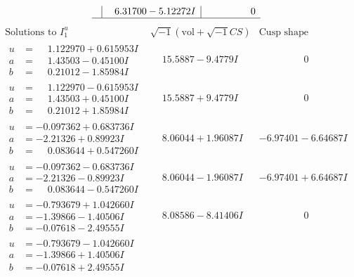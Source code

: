 \documentclass[1p]{elsarticle_modified}
\theoremstyle{definition}
\newcommand{\I}{\sqrt{-1}}
\begin{document}
$$\begin{array}{c|c|c}
 & \phantom{-}6.31700 - 5.12272 I & \phantom{-0.000000 } 0\\
 \hline 
 \end{array}$$\newpage$$\begin{array}{c|c|c}  
\text{Solutions to }I^u_{1}& \I (\text{vol} + \sqrt{-1}CS) & \text{Cusp shape}\\
 \hline 
\begin{aligned}
u &= \phantom{-}1.122970 + 0.615953 I \\
a &= \phantom{-}1.43503 - 0.45100 I \\
b &= \phantom{-}0.21012 - 1.85984 I\end{aligned}
 & \phantom{-}15.5887 - 9.4779 I & \phantom{-0.000000 } 0 \\ \hline\begin{aligned}
u &= \phantom{-}1.122970 - 0.615953 I \\
a &= \phantom{-}1.43503 + 0.45100 I \\
b &= \phantom{-}0.21012 + 1.85984 I\end{aligned}
 & \phantom{-}15.5887 + 9.4779 I & \phantom{-0.000000 } 0 \\ \hline\begin{aligned}
u &= -0.097362 + 0.683736 I \\
a &= -2.21326 + 0.89923 I \\
b &= \phantom{-}0.083644 + 0.547260 I\end{aligned}
 & \phantom{-}8.06044 + 1.96087 I & -6.97401 - 6.64687 I \\ \hline\begin{aligned}
u &= -0.097362 - 0.683736 I \\
a &= -2.21326 - 0.89923 I \\
b &= \phantom{-}0.083644 - 0.547260 I\end{aligned}
 & \phantom{-}8.06044 - 1.96087 I & -6.97401 + 6.64687 I \\ \hline\begin{aligned}
u &= -0.793679 + 1.042660 I \\
a &= -1.39866 - 1.40506 I \\
b &= -0.07618 - 2.49555 I\end{aligned}
 & \phantom{-}8.08586 - 8.41406 I & \phantom{-0.000000 } 0 \\ \hline\begin{aligned}
u &= -0.793679 - 1.042660 I \\
a &= -1.39866 + 1.40506 I \\
b &= -0.07618 + 2.49555 I\end{aligned}

\end{array}$$
\end{document}
